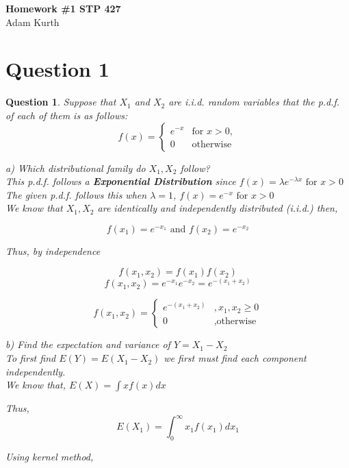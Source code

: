 \documentclass{article}
\theoremstyle{questionstyle}
\newtheorem{myquestion}{Question}
\begin{document}
\begin{center}
    \Large{\textbf{Homework \#1 STP 427}}\\
    Adam Kurth
\end{center}

\section{Question 1}
\begin{myquestion}
    Suppose that $X_1$ and $X_2$ are i.i.d. random variables that the p.d.f. of each of them is as follows:
    \[
    f(x) = 
    \begin{cases}
        e^{-x} & \text{for } x > 0,\\
        0 & \text{otherwise}
     \end{cases} \]

 a) Which distributional family do \(X_1, X_2\) follow?\\

This p.d.f. follows a \textbf{Exponential Distribution} since \(f(x) = \lambda e^{-\lambda x} \text{ for } x > 0\)\\

The given p.d.f. follows this when $\lambda =1$, \(f(x) = e^{-x} \text{ for } x>0\)\\

We know that \(X_1, X_2\) are identically and independently distributed (i.i.d.) then,

\[f(x_1) = e^{-x_1} \text{ and } f(x_2) = e^{-x_2}\]

Thus, by independence

\[f(x_1,x_2) = f(x_1)f(x_2)\] 
\[f(x_1, x_2) = e^{-x_1}e^{-x_2} = e^{-(x_1 + x_2)}\]


\[
f(x_1, x_2) = 
\begin{cases}
e^{-(x_1 + x_2)} & , x_1,x_2 \geq 0\\
0 & , \text{otherwise}
\end{cases}
\]

b) Find the expectation and variance of \(Y=X_1 - X_2\)\\

To first find \( E(Y) = E(X_1 - X_2)\) we first must find each component independently.\\

We know that, \(E(X) = \int x f(x) dx\)

Thus, 
\[E(X_1) = \int_{0}^{\infty} x_1 f(x_1) dx_1\]

Using kernel method,\\


\end{myquestion}
\end{document}
